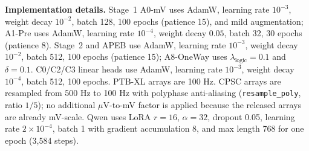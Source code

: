 \documentclass[preprint,12pt]{elsarticle}
\begin{document}
\textbf{Implementation details.} Stage~1 A0-mV uses AdamW, learning rate $10^{-3}$, weight decay $10^{-2}$, batch 128, 100 epochs (patience 15), and mild augmentation; A1-Pre uses AdamW, learning rate $10^{-4}$, weight decay $0.05$, batch 32, 30 epochs (patience 8). Stage~2 and APEB use AdamW, learning rate $10^{-3}$, weight decay $10^{-2}$, batch 512, 100 epochs (patience 15); A8-OneWay uses $\lambda_{\text{logic}}=0.1$ and $\delta=0.1$. C0/C2/C3 linear heads use AdamW, learning rate $10^{-3}$, weight decay $10^{-4}$, batch 512, 100 epochs. PTB-XL arrays are 100 Hz. CPSC arrays are resampled from 500 Hz to 100 Hz with polyphase anti-aliasing (\texttt{resample\_poly}, ratio $1/5$); no additional $\mu$V-to-mV factor is applied because the released arrays are already mV-scale. Qwen uses LoRA $r=16$, $\alpha=32$, dropout 0.05, learning rate $2\times10^{-4}$, batch 1 with gradient accumulation 8, and max length 768 for one epoch (3,584 steps).
\end{document}
